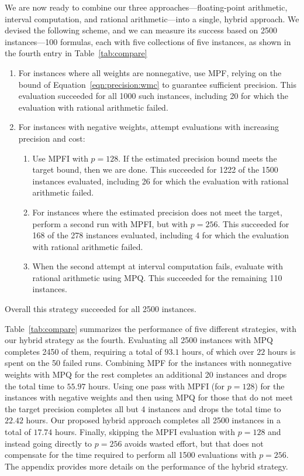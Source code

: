 \documentclass[letterpaper,USenglish,cleveref, autoref, thm-restate]{lipics-v2021}
\begin{document}
We are now ready to combine our three approaches---floating-point
arithmetic, interval computation, and rational arithmetic---into a
single, hybrid approach.  We devised the following scheme, and we can
measure its success based on 2500 instances---100 formulas, each with five collections of five instances, as shown in the fourth entry in Table~\ref{tab:compare}
\begin{enumerate}
\item For instances where all weights are nonnegative, use MPF,
  relying on the bound of Equation~\ref{eqn:precision:wmc} to
  guarantee sufficient precision.  This evaluation succeeded for all 1000 such
  instances, including 20 for which the evaluation with rational arithmetic failed.
\item For instances with negative weights, attempt evaluations with increasing precision and cost:
\begin{enumerate}
\item 
  Use MPFI with $p=128$.  If the estimated precision
  bound meets the target bound, then we are done.  This succeeded for
  1222 of the 1500 instances evaluated, including 26 for which the evaluation with rational arithmetic failed.
\item For instances where the estimated precision does not meet the target, perform a second run with MPFI, but with $p=256$.  This succeeded
  for 168 of the 278 instances evaluated, including 4 for which the evaluation with rational arithmetic failed.
\item When the second attempt at interval computation fails, evaluate with rational arithmetic using MPQ\@.
This
  succeeded for the remaining 110 instances.
\end{enumerate}
\end{enumerate}
Overall this strategy succeeded for all 2500 instances.

Table~\ref{tab:compare} summarizes the performance of five different strategies, with our hybrid strategy as the fourth.
Evaluating all 2500
instances with MPQ completes
2450 of them, requiring a
total of $93.1$ hours, of which over 
$22$ hours is spent on the 50 failed runs.
Combining MPF for the instances with nonnegative weights with MPQ for the rest
completes an
additional 20 instances and drops the total time to $55.97$ hours.
Using one pass with MPFI (for $p=128$)
for the instances with negative weights and then using MPQ for those
that do not meet the target precision completes all but 4 instances
and drops the total time to $22.42$ hours.
Our proposed hybrid approach completes all 2500 instances in a total of
$17.74$ hours.
Finally, skipping the MPFI evaluation with $p=128$ and instead going directly to $p=256$ avoids
wasted effort, but that
does not
compensate for the time required to perform all 1500 evaluations 
with $p=256$.  The appendix provides more
details on the performance of the hybrid strategy.
\end{document}
